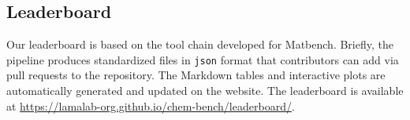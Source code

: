 \clearpage


\clearpage
\subsection{Leaderboard}
Our leaderboard is based on the tool chain developed for Matbench.\autocite{Dunn_2020}
Briefly, the \chembench pipeline produces standardized files in \texttt{json} format that contributors can add via pull requests to the \chembench repository.
The Markdown tables and interactive plots are automatically generated and updated on the \chembench website. The leaderboard is available at \url{https://lamalab-org.github.io/chem-bench/leaderboard/}.

\clearpage

\printnoidxglossary[type=\acronymtype, nonumberlist]  %
